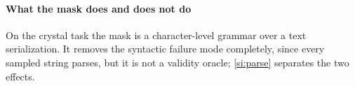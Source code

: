 \paragraph{What the mask does and does not do}
On the crystal task the mask is a character-level grammar over a text serialization. It
removes the syntactic failure mode completely, since every sampled string parses, but it is
not a validity oracle; \cref{si:parse} separates the two effects.


